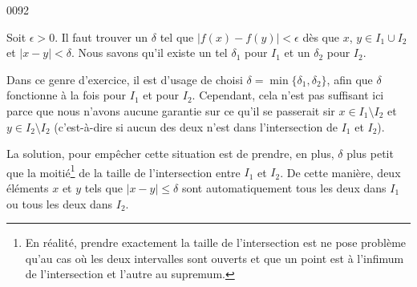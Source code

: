 
\begin{corrige}{0092}

Soit $\epsilon>0$. Il faut trouver un $\delta$ tel que $| f(x)-f(y) |<\epsilon$ dès que $x$, $y\in I_1\cup I_2$ et $| x-y |<\delta$. Nous savons qu'il existe un tel $\delta_1$ pour $I_1$ et un $\delta_2$ pour $I_2$.

Dans ce genre d'exercice, il est d'usage de choisi $\delta=\min\{ \delta_1,\delta_2 \}$, afin que $\delta$ fonctionne à la fois pour $I_1$ et pour $I_2$. Cependant, cela n'est pas suffisant ici parce que nous n'avons aucune garantie sur ce qu'il se passerait sir $x\in I_1\setminus I_2$ et $y\in I_2\setminus I_2$ (c'est-à-dire si aucun des deux n'est dans l'intersection de $I_1$ et $I_2$).

La solution, pour empêcher cette situation est de prendre, en plus, $\delta$ plus petit que la moitié\footnote{En réalité, prendre exactement la taille de l'intersection est ne pose problème qu'au cas où les deux intervalles sont ouverts et que un point est à l'infimum de l'intersection et l'autre au supremum.} de la taille de l'intersection entre $I_1$ et $I_2$. De cette manière, deux éléments $x$ et $y$ tels que $| x-y |\leq\delta$ sont automatiquement tous les deux dans $I_1$ ou tous les deux dans $I_2$.

\end{corrige}
